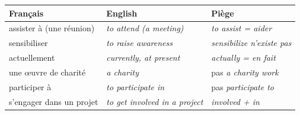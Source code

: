 \documentclass[11pt]{article}
\newcommand{\eng}[1]{\ifmmode\text{\textit{#1}}\else\begingroup\selectlanguage{english}\itshape #1\endgroup\fi}
\begin{document}
\begin{attention}
\begin{center}
\begin{tabularx}{\linewidth}{|X|X|X|}\hline
\rowcolor{popblueL} \textbf{Français} & \textbf{English} & \textbf{Piège} \\ \hline
assister à (une réunion) & \eng{to attend (a meeting)} & \eng{to assist} = aider \\ \hline
sensibiliser & \eng{to raise awareness} & \eng{sensibilize} n'existe pas \\ \hline
actuellement & \eng{currently, at present} & \eng{actually} = en fait \\ \hline
une œuvre de charité & \eng{a charity} & pas \eng{a charity work} \\ \hline
participer à & \eng{to participate in} & pas \eng{participate to} \\ \hline
s'engager dans un projet & \eng{to get involved in a project} & \eng{involved} + \eng{in} \\ \hline
\end{tabularx}
\end{center}
\end{attention}
\end{document}
